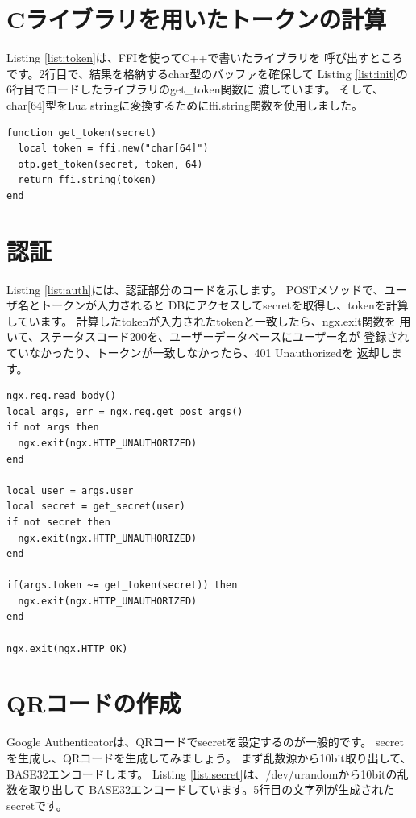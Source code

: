 \section*{Cライブラリを用いたトークンの計算}
Listing \ref{list:token}は、FFIを使ってC++で書いたライブラリを
呼び出すところです。2行目で、結果を格納するchar型のバッファを確保して
Listing \ref{list:init}の6行目でロードしたライブラリのget\_token関数に
渡しています。
そして、char[64]型をLua stringに変換するためにffi.string関数を使用しました。

\begin{lstlisting}[caption=Tokenを計算,label=list:token]
function get_token(secret)
  local token = ffi.new("char[64]")
  otp.get_token(secret, token, 64)
  return ffi.string(token)
end
\end{lstlisting}

\section*{認証}
Listing \ref{list:auth}には、認証部分のコードを示します。
POSTメソッドで、ユーザ名とトークンが入力されると
DBにアクセスしてsecretを取得し、tokenを計算しています。
計算したtokenが入力されたtokenと一致したら、ngx.exit関数を
用いて、ステータスコード200を、ユーザーデータベースにユーザー名が
登録されていなかったり、トークンが一致しなかったら、401 Unauthorizedを
返却します。

\begin{lstlisting}[caption=SQL Schema,label=list:auth]
ngx.req.read_body()
local args, err = ngx.req.get_post_args()
if not args then
  ngx.exit(ngx.HTTP_UNAUTHORIZED)
end

local user = args.user
local secret = get_secret(user)
if not secret then
  ngx.exit(ngx.HTTP_UNAUTHORIZED)
end

if(args.token ~= get_token(secret)) then
  ngx.exit(ngx.HTTP_UNAUTHORIZED)
end

ngx.exit(ngx.HTTP_OK)
\end{lstlisting}

\section*{QRコードの作成}
Google Authenticatorは、QRコードでsecretを設定するのが一般的です。
secretを生成し、QRコードを生成してみましょう。
まず乱数源から10bit取り出して、BASE32エンコードします。
Listing \ref{list:secret}は、/dev/urandomから10bitの乱数を取り出して
BASE32エンコードしています。5行目の文字列が生成されたsecretです。

